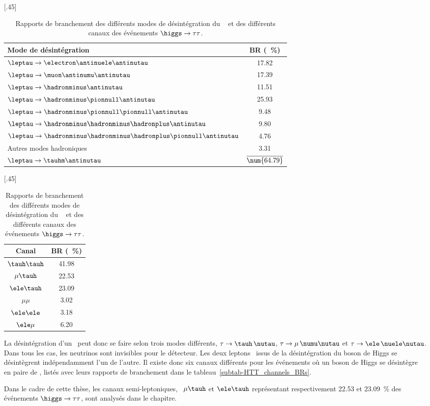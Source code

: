 \begin{table}[h]
\centering
{}[.45\textwidth]
{\begin{tabular}{lc}
\toprule
Mode de désintégration & BR (\SI{}{\%})\\
\midrule
$\leptau\to \electron\antinuele\antinutau$ & \num{17.82} \\
$\leptau\to \muon\antinumu\antinutau$ & \num{17.39} \\
\midrule
$\leptau\to \hadronminus \antinutau$ & \num{11.51} \\
$\leptau\to \hadronminus \pionnull \antinutau$ & \num{25.93} \\
$\leptau\to \hadronminus \pionnull\pionnull \antinutau$ & \num{9.48} \\
$\leptau\to \hadronminus \hadronminus\hadronplus \antinutau$ & \num{9.80} \\
$\leptau\to \hadronminus \hadronminus\hadronplus\pionnull\antinutau$ & \num{4.76} \\
Autres modes hadroniques & \num{3.31} \\
$\leptau\to \tauhm \antinutau$ & $\overline{\text{\num{64.79}}}$ \\
\bottomrule
\end{tabular}}
\hfill
{}[.45\textwidth]
{\begin{tabular}{cc}
\toprule
Canal & BR (\SI{}{\%})\\
\midrule
$\tauh\tauh$ & \num{41.98} \\
$\mu\tauh$ & \num{22.53} \\
$\ele\tauh$ & \num{23.09} \\
$\mu\mu$ & \num{3.02} \\
$\ele\ele$ & \num{3.18} \\
$\ele\mu$ & \num{6.20} \\
\bottomrule
\end{tabular}}
\caption[Rapports de branchement des événements $\higgs\to\tau\tau$.]{Rapports de branchement des différents modes de désintégration du \tau~\cite{PDG_booklet_2018} et des différents canaux des événements $\higgs\to\tau\tau$.}
\label{tab-tau_decay_and_HTT_channels_BRs}
\end{table}
\par La désintégration d'un \tau\ peut donc se faire selon trois modes différents, $\tau\to\tauh\,\nutau$, $\tau\to\mu\,\numu\nutau$ et $\tau\to\ele\,\nuele\nutau$.
Dans tous les cas, les neutrinos sont invisibles pour le détecteur.
Les deux leptons \tau\ issus de la désintégration du boson de Higgs se désintègrent indépendamment l'un de l'autre.
Il existe donc six canaux différents pour les événements où un boson de Higgs se désintègre en paire de \tau, listés avec leurs rapports de branchement dans le tableau~\ref{subtab-HTT_channels_BRs}.
\par Dans le cadre de cette thèse, les canaux semi-leptoniques, \ie\ $\mu\tauh$ et $\ele\tauh$ représentant respectivement \num{22.53} et \SI{23.09}{\%} des événements $\higgs\to\tau\tau$, sont analysés dans le chapitre.
